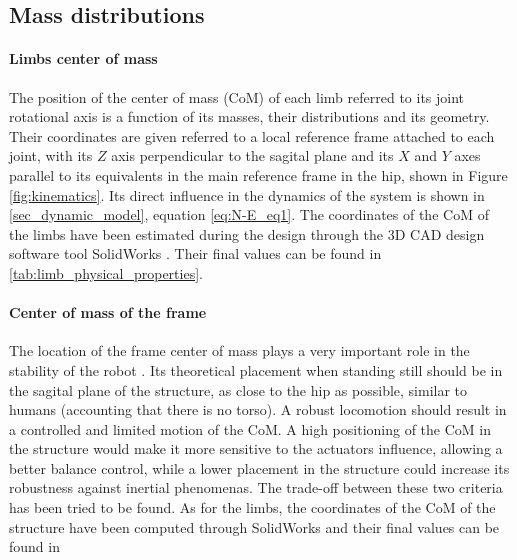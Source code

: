 
\subsection{Mass distributions} %
\label{sub:centers_of_mass}

\paragraph{Limbs center of mass} %
\label{par:limbs_center_of_mass}
The position of the center of mass (CoM) of each limb referred to its joint rotational axis is a function of its masses, their distributions and its geometry.
Their coordinates are given referred to a local reference frame attached to each joint, with its $Z$ axis perpendicular to the sagital plane and its $X$ and $Y$ axes parallel to its equivalents in the main reference frame in the hip, shown in Figure \ref{fig:kinematics}.
Its direct influence in the dynamics of the system is shown in \ref{sec_dynamic_model}, equation \ref{eq:N-E_eq1}.
The coordinates of the CoM of the limbs have been estimated during the design through the 3D CAD design software tool SolidWorks \cite{solidworks}.
Their final values can be found in \ref{tab:limb_physical_properties}.


\paragraph{Center of mass of the frame} %
\label{par:center_of_mass_of_the_frame}
The location of the frame center of mass plays a very important role in the stability of the robot \cite{rojas}.
Its theoretical placement when standing still should be in the sagital plane of the structure, as close to the hip as possible, similar to humans (accounting that there is no torso).
A robust locomotion should result in a controlled and limited motion of the CoM. 
A high positioning of the CoM in the structure would make it more sensitive to the actuators influence, allowing a better balance control, while a lower placement in the structure could increase its robustness against inertial phenomenas.
The trade-off between these two criteria has been tried to be found.
As for the limbs, the coordinates of the CoM of the structure have been computed through SolidWorks and their final values can be found in %

